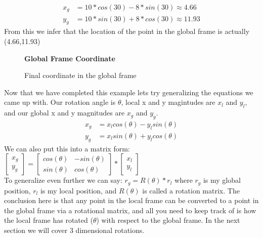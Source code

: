 \documentclass[12pt,letterpaper,boxed]{hmcpset}
\begin{document}
	\begin{align*}
	x_{g} &= 10*cos(30)-8*sin(30) \approx 4.66\\
	y_{g} &= 10*sin(30)+8*cos(30) \approx 11.93
	\end{align*}
From this we infer that the location of the point in the global frame is actually (4.66,11.93)
\begin{figure}[H]
	\centering
	\textbf{Global Frame Coordinate}\par\medskip
	\caption{Final coordinate in the global frame}
	\label{fig:GlobalFrameCoordinate}
\end{figure}

Now that we have completed this example lets try generalizing the equations we came up with. Our rotation angle is $\theta$, local x and y magintudes are $x_{l}$ and $y_{l}$, and our global x and y magnitudes are $x_{g}$ and $y_{g}$.
	\begin{align*}
	x_{g} &= x_{l}cos(\theta)-y_{l}sin(\theta)\\
	y_{g} &= x_{l}sin(\theta)+y_{l}cos(\theta)
	\end{align*}
We can also put this into a matrix form:
\begin{math}
	\begin{bmatrix}
	x_{g}\\
	y_{g}
	\end{bmatrix}=
	\begin{bmatrix}
	cos(\theta)&-sin(\theta)\\
	sin(\theta)&cos(\theta)
	\end{bmatrix}*
	\begin{bmatrix}
	x_{l}\\
	y_{l}
	\end{bmatrix}
\end{math}\\
To generalize even further we can say: $r_{g} = R(\theta)*r_{l}$ where $r_{g}$ is my global position, $r_{l}$ is my local position, and $R(\theta)$ is called a rotation matrix. The conclusion here is that any point in the local frame can be converted to a point in the global frame via a rotational matrix, and all you need to keep track of is how the local frame has rotated ($\theta$) with respect to the global frame. In the next section we will cover 3 dimensional rotations.\\
\end{document}
